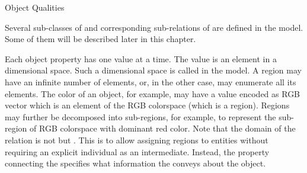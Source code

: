 \begin{ODP}{Object Qualities}
\end{ODP}

Several sub-classes of  and corresponding sub-relations of  are defined in the \neem model.
Some of them will be described later in this chapter.

Each object property has one value at a time.
The value is an element in a dimensional space.
Such a dimensional space is called  in the \neem model.
A region may have an infinite number of elements, or, in the other case, may enumerate all its elements.
The color of an object, for example, may have a value encoded as RGB vector which is an element of the RGB colorspace (which is a region).
Regions may further be decomposed into sub-regions, for example, to represent the sub-region of RGB colorspace with dominant red color.
Note that the domain of the relation  is not  but .
This is to allow assigning regions to entities without requiring an explicit  individual as an intermediate. Instead, the property connecting the  specifies what information the  conveys about the object.

